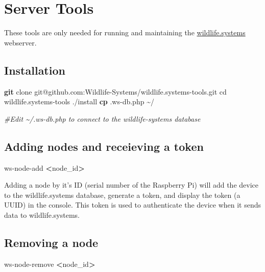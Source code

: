 \documentclass[
]{book}
\newenvironment{Shaded}{\begin{snugshade}}{\end{snugshade}}
\newcommand{\BuiltInTok}[1]{#1}
\newcommand{\CommentTok}[1]{\textcolor[rgb]{0.56,0.35,0.01}{\textit{#1}}}
\newcommand{\ExtensionTok}[1]{#1}
\newcommand{\FunctionTok}[1]{\textcolor[rgb]{0.13,0.29,0.53}{\textbf{#1}}}
\newcommand{\NormalTok}[1]{#1}
\newcommand{\OperatorTok}[1]{\textcolor[rgb]{0.81,0.36,0.00}{\textbf{#1}}}
\begin{document}
\chapter{Server Tools}\label{server-tools}

These tools are only needed for running and maintaining the \href{https://wildlife.systems}{wildlife.systems} webserver.

\section{Installation}\label{installation}

\begin{Shaded}
\begin{Highlighting}[]
\FunctionTok{git}\NormalTok{ clone git@github.com:Wildlife{-}Systems/wildlife.systems{-}tools.git}
\BuiltInTok{cd}\NormalTok{ wildlife.systems{-}tools}
\ExtensionTok{./install}
\FunctionTok{cp}\NormalTok{ .ws{-}db.php \textasciitilde{}/}

\CommentTok{\#Edit \textasciitilde{}/.ws{-}db.php to connect to the wildlife{-}systems database}
\end{Highlighting}
\end{Shaded}

\section{Adding nodes and receieving a token}\label{adding-nodes-and-receieving-a-token}

\begin{Shaded}
\begin{Highlighting}[]
\ExtensionTok{ws{-}node{-}add} \OperatorTok{\textless{}}\NormalTok{node\_id}\OperatorTok{\textgreater{}}
\end{Highlighting}
\end{Shaded}

Adding a node by it's ID (serial number of the Raspberry Pi) will add the device to the wildlife.systems database, generate a token, and display the token (a UUID) in the console. This token is used to authenticate the device when it sends data to wildlife.systems.

\section{Removing a node}\label{removing-a-node}

\begin{Shaded}
\begin{Highlighting}[]
\ExtensionTok{ws{-}node{-}remove} \OperatorTok{\textless{}}\NormalTok{node\_id}\OperatorTok{\textgreater{}}
\end{Highlighting}
\end{Shaded}
\end{document}
